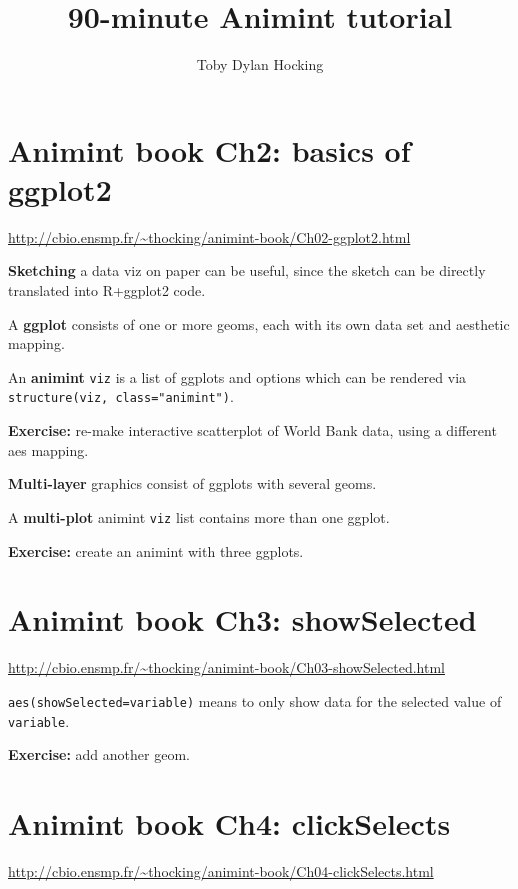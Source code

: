 \documentclass{article}
\begin{document}
\title{90-minute Animint tutorial}
\author{Toby Dylan Hocking}
\maketitle
\thispagestyle{empty}

\section*{Animint book Ch2: basics of ggplot2}

\url{http://cbio.ensmp.fr/~thocking/animint-book/Ch02-ggplot2.html}

\hrulefill

\textbf{Sketching} a data viz on paper can be useful, since the sketch
can be directly translated into R+ggplot2 code.

A \textbf{ggplot} consists of one or more geoms, each with its own
data set and aesthetic mapping.

An \textbf{animint} \texttt{viz} is a list of ggplots and options
which can be rendered via \verb|structure(viz, class="animint")|.

\textbf{Exercise:} re-make interactive scatterplot of World Bank data,
using a different aes mapping.

\hrulefill


\textbf{Multi-layer} graphics consist of ggplots with several geoms.

A \textbf{multi-plot} animint \texttt{viz} list contains more than one
ggplot.

\textbf{Exercise:} create an animint with three ggplots.

\section*{Animint book Ch3: showSelected}

\url{http://cbio.ensmp.fr/~thocking/animint-book/Ch03-showSelected.html}

\hrulefill

\texttt{aes(showSelected=variable)} means to only show data for the
selected value of \texttt{variable}.

\textbf{Exercise:} add another geom.

\hrulefill

\section*{Animint book Ch4: clickSelects}
\url{http://cbio.ensmp.fr/~thocking/animint-book/Ch04-clickSelects.html}
\end{document}
